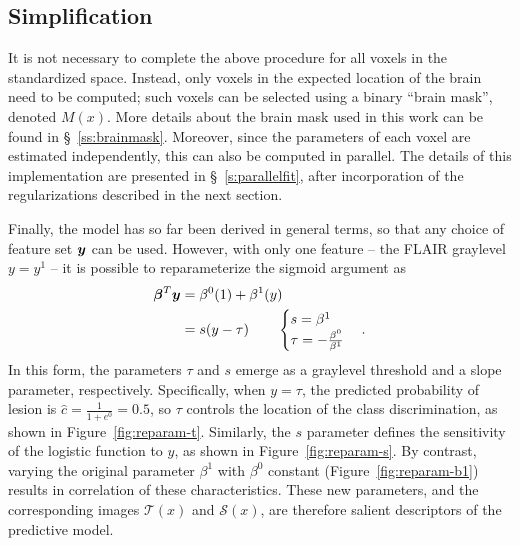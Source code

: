\subsection{Simplification}\label{ss:vlr-simple}
It is not necessary to complete the above procedure for all voxels in the standardized space.
Instead, only voxels in the expected location of the brain need to be computed;
such voxels can be selected using a binary ``brain mask'', denoted $M(x)$.
More details about the brain mask used in this work can be found in \S~\ref{ss:brainmask}.
Moreover, since the parameters of each voxel are estimated independently,
this can also be computed in parallel.
The details of this implementation are presented in \S~\ref{s:parallelfit},
after incorporation of the regularizations described in the next section.
\par
Finally, the model has so far been derived in general terms,
so that any choice of feature set $\bm{y}$ can be used.
However, with only one feature -- the FLAIR graylevel $y = y^1$ --
it is possible to reparameterize the sigmoid argument as
\begin{align}
  \bb^T\by &= \b^0(1) + \b^1(y)\nonumber\\
           &= s(y-\tau)
           \qquad\begin{cases}
             s = \b^1\\
             \tau = -\frac{\b^0}{\b^1}
           \end{cases}.%
  \label{eq:reparameterize}
\end{align}
In this form, the parameters $\tau$ and $s$ emerge
as a graylevel threshold and a slope parameter, respectively.
Specifically, when $y = \tau$,
the predicted probability of lesion is $\hat{c} = \tfrac{1}{1+e^{0}} = 0.5$,
so $\tau$ controls the location of the class discrimination,
as shown in Figure~\ref{fig:reparam-t}.
Similarly, the $s$ parameter defines the sensitivity of the logistic function to $y$,
as shown in Figure~\ref{fig:reparam-s}.
By contrast, varying the original parameter $\beta^1$ with $\beta^0$ constant
(Figure~\ref{fig:reparam-b1}) results in correlation of these characteristics.
These new parameters, and the corresponding images $\mathcal{T}(x)$ and $\mathcal{S}(x)$,
are therefore salient descriptors of the predictive model.
